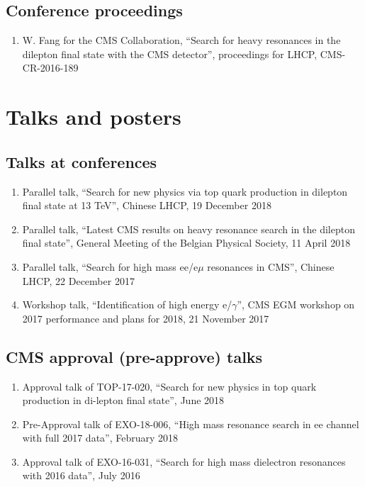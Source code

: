 \subsection*{Conference proceedings}
\begin{enumerate}%
\item{W. Fang for the CMS Collaboration, ``Search for heavy resonances in the dilepton final state with the CMS detector'', proceedings for LHCP, CMS-CR-2016-189}
\end{enumerate}



\section*{Talks and posters}

\subsection*{Talks at conferences}
\begin{enumerate}%
\item{Parallel talk, ``Search for new physics via top quark production in dilepton final state at 13 TeV'', Chinese LHCP, 19 December 2018}
\item{Parallel talk, ``Latest CMS results on heavy resonance search in the dilepton final state'', General Meeting of the Belgian Physical Society, 11 April 2018}
\item{Parallel talk, ``Search for high mass ee/e$\mu$ resonances in CMS'', Chinese LHCP, 22 December 2017}
\item{Workshop talk, ``Identification of high energy e/$\gamma$'', CMS EGM workshop on 2017 performance and plans for 2018, 21 November 2017}
\end{enumerate}

\subsection*{CMS approval (pre-approve) talks}
\begin{enumerate}%
\item{Approval talk of TOP-17-020, ``Search for new physics in top quark production in di-lepton final state'', June 2018}
\item{Pre-Approval talk of EXO-18-006, ``High mass resonance search in ee channel with full 2017 data'', February 2018}
\item{Approval talk of EXO-16-031, ``Search for high mass dielectron resonances with 2016 data'', July 2016}
\end{enumerate}

